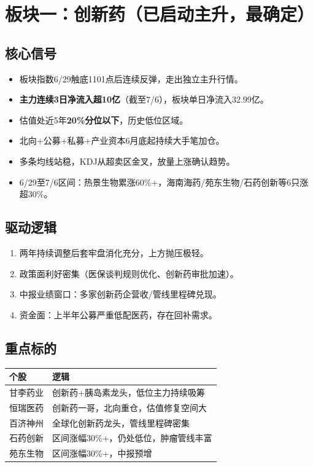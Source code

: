 \documentclass[a4paper,11pt,fontset=none]{ctexart}
\begin{document}
\section{板块一：创新药（已启动主升，最确定）}

\subsection*{核心信号}
\begin{itemize}
  \item 板块指数6/29触底1101点后连续反弹，走出独立主升行情。
  \item \textbf{主力连续3日净流入超10亿}（截至7/6），板块单日净流入32.99亿。
  \item 估值处近5年\textbf{20\%分位以下}，历史低位区域。
  \item 北向+公募+私募+产业资本6月底起持续大手笔加仓。
  \item 多条均线站稳，KDJ从超卖区金叉，放量上涨确认趋势。
  \item 6/29至7/6区间：热景生物累涨60\%+，海南海药/苑东生物/石药创新等6只涨超30\%。
\end{itemize}

\subsection*{驱动逻辑}
\begin{enumerate}
  \item 两年持续调整后套牢盘消化充分，上方抛压极轻。
  \item 政策面利好密集（医保谈判规则优化、创新药审批加速）。
  \item 中报业绩窗口：多家创新药企营收/管线里程碑兑现。
  \item 资金面：上半年公募严重低配医药，存在回补需求。
\end{enumerate}

\subsection*{重点标的}
\begin{tabularx}{\textwidth}{L{3cm}X}
\toprule
\textbf{个股} & \textbf{逻辑} \\
\midrule
甘李药业 & 创新药+胰岛素龙头，低位主力持续吸筹 \\
恒瑞医药 & 创新药一哥，北向重仓，估值修复空间大 \\
百济神州 & 全球化创新药龙头，管线里程碑密集 \\
石药创新 & 区间涨幅30\%+，仍处低位，肿瘤管线丰富 \\
苑东生物 & 区间涨幅30\%+，中报预增 \\
\bottomrule
\end{tabularx}
\end{document}

